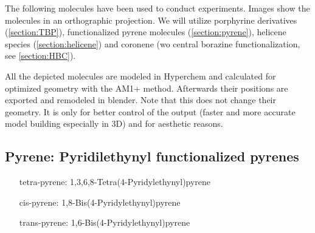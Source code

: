 \label{chapter:used-molecules}
The following molecules have been used to conduct experiments. Images show the molecules in an orthographic projection. We will utilize porphyrine derivatives (\autoref{section:TBP}), functionalized pyrene molecules (\autoref{section:pyrene}), helicene species (\autoref{section:helicene}) and coronene (w\/o central borazine functionalization, see \autoref{section:HBC}).

All the depicted molecules are modeled in Hyperchem\cite{_hyperchemtm_1111} and calculated for optimized geometry with the AM1+ method. Afterwards their positions are exported and remodeled in blender. Note that this does not change their geometry. It is only for better control of the output (faster and more accurate model building especially in 3D) and for aesthetic reasons.

\subsection{Pyrene: Pyridilethynyl functionalized pyrenes}
\label{sec:pyrene}
\begin{itemize}
	\item[tetra-pyrene:] 1,3,6,8-Tetra(4-Pyridylethynyl)pyrene
	\item[cis-pyrene:] 1,8-Bis(4-Pyridylethynyl)pyrene
	\item[trans-pyrene:] 1,6-Bis(4-Pyridylethynyl)pyrene
\end{itemize}

